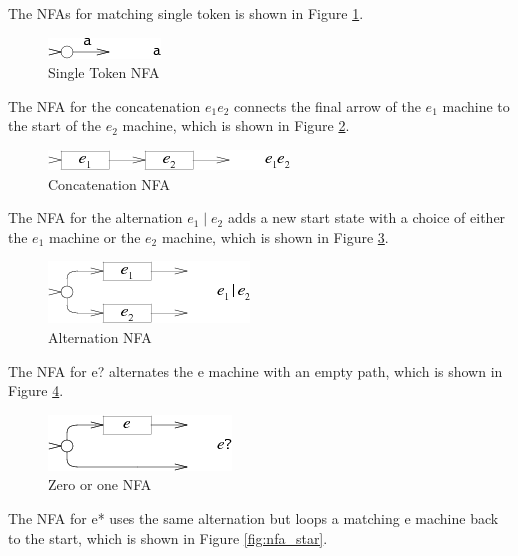 The NFAs for matching single token is shown in Figure \ref{fig:nfa_single}.

\begin{figure}[htbp]
  \centering
  \includegraphics[scale=1]{images/single_token.png}
  \caption{Single Token NFA}
  \label{fig:nfa_single}
\end{figure}

The NFA for the concatenation $e_1e_2$ connects the final arrow of the $e_1$ machine to the start of the $e_2$ machine, which is shown in Figure \ref{fig:nfa_cocat}.

\begin{figure}[htbp]
  \centering
  \includegraphics[scale=1]{images/concatenation_tokens.png}
  \caption{Concatenation NFA}
  \label{fig:nfa_cocat}
\end{figure}

The NFA for the alternation $e_1\mid e_2$ adds a new start state with a choice of either the $e_1$ machine or the $e_2$ machine, which is shown in Figure \ref{fig:nfa_alternation}.

\begin{figure}[htbp]
  \centering
  \includegraphics[scale=1]{images/alternation.png}
  \caption{Alternation NFA}
  \label{fig:nfa_alternation}
\end{figure}

The NFA for e? alternates the e machine with an empty path, which is shown in Figure \ref{fig:nfa_question}.

\begin{figure}[htbp]
  \centering
  \includegraphics[scale=1]{images/question.png}
  \caption{Zero or one NFA}
  \label{fig:nfa_question}
\end{figure}

The NFA for e* uses the same alternation but loops a matching e machine back to the start, which is shown in Figure \ref{fig:nfa_star}.

